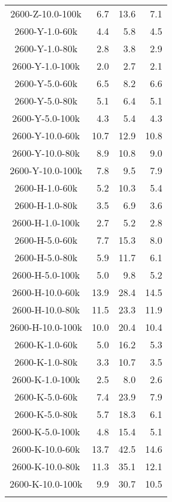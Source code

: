 \begin{longtable}{crrr}
    2600-Z-10.0-100k &    6.7 &   13.6 &    7.1 \\
    2600-Y-1.0-60k   &    4.4 &    5.8 &    4.5 \\
    2600-Y-1.0-80k   &    2.8 &    3.8 &    2.9 \\
    2600-Y-1.0-100k  &    2.0 &    2.7 &    2.1 \\
    2600-Y-5.0-60k   &    6.5 &    8.2 &    6.6 \\
    2600-Y-5.0-80k   &    5.1 &    6.4 &    5.1 \\
    2600-Y-5.0-100k  &    4.3 &    5.4 &    4.3 \\
    2600-Y-10.0-60k  &   10.7 &   12.9 &   10.8 \\
    2600-Y-10.0-80k  &    8.9 &   10.8 &    9.0 \\
    2600-Y-10.0-100k &    7.8 &    9.5 &    7.9 \\
    2600-H-1.0-60k   &    5.2 &   10.3 &    5.4 \\
    2600-H-1.0-80k   &    3.5 &    6.9 &    3.6 \\
    2600-H-1.0-100k  &    2.7 &    5.2 &    2.8 \\
    2600-H-5.0-60k   &    7.7 &   15.3 &    8.0 \\
    2600-H-5.0-80k   &    5.9 &   11.7 &    6.1 \\
    2600-H-5.0-100k  &    5.0 &    9.8 &    5.2 \\
    2600-H-10.0-60k  &   13.9 &   28.4 &   14.5 \\
    2600-H-10.0-80k  &   11.5 &   23.3 &   11.9 \\
    2600-H-10.0-100k &   10.0 &   20.4 &   10.4 \\
    2600-K-1.0-60k   &    5.0 &   16.2 &    5.3 \\
    2600-K-1.0-80k   &    3.3 &   10.7 &    3.5 \\
    2600-K-1.0-100k  &    2.5 &    8.0 &    2.6 \\
    2600-K-5.0-60k   &    7.4 &   23.9 &    7.9 \\
    2600-K-5.0-80k   &    5.7 &   18.3 &    6.1 \\
    2600-K-5.0-100k  &    4.8 &   15.4 &    5.1 \\
    2600-K-10.0-60k  &   13.7 &   42.5 &   14.6 \\
    2600-K-10.0-80k  &   11.3 &   35.1 &   12.1 \\
    2600-K-10.0-100k &    9.9 &   30.7 &   10.5 \\
    \label{tab:spirou_precisions}
\end{longtable}
